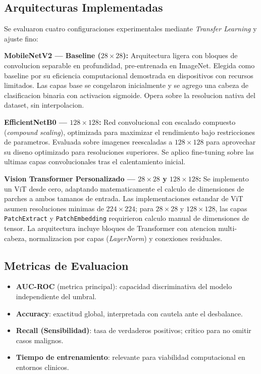 \documentclass[12pt, a4paper]{article}
\begin{document}
\subsection{Arquitecturas Implementadas}

Se evaluaron cuatro configuraciones experimentales mediante \textit{Transfer Learning} y ajuste fino:

\textbf{MobileNetV2 --- Baseline ($28\times28$):} Arquitectura ligera con bloques de convolucion separable en profundidad, pre-entrenada en ImageNet. Elegida como baseline por su eficiencia computacional demostrada en dispositivos con recursos limitados. Las capas base se congelaron inicialmente y se agrego una cabeza de clasificacion binaria con activacion sigmoide. Opera sobre la resolucion nativa del dataset, sin interpolacion.

\textbf{EfficientNetB0 --- $128\times128$:} Red convolucional con escalado compuesto (\textit{compound scaling}), optimizada para maximizar el rendimiento bajo restricciones de parametros. Evaluada sobre imagenes reescaladas a $128\times128$ para aprovechar su diseno optimizado para resoluciones superiores. Se aplico fine-tuning sobre las ultimas capas convolucionales tras el calentamiento inicial.

\textbf{Vision Transformer Personalizado --- $28\times28$ y $128\times128$:} Se implemento un ViT desde cero, adaptando matematicamente el calculo de dimensiones de parches a ambos tamanos de entrada. Las implementaciones estandar de ViT asumen resoluciones minimas de $224\times224$; para $28\times28$ y $128\times128$, las capas \texttt{PatchExtract} y \texttt{PatchEmbedding} requirieron calculo manual de dimensiones de tensor. La arquitectura incluye bloques de Transformer con atencion multi-cabeza, normalizacion por capas (\textit{LayerNorm}) y conexiones residuales.

\subsection{Metricas de Evaluacion}

\begin{itemize}
    \item \textbf{AUC-ROC} (metrica principal): capacidad discriminativa del modelo independiente del umbral.
    \item \textbf{Accuracy}: exactitud global, interpretada con cautela ante el desbalance.
    \item \textbf{Recall (Sensibilidad)}: tasa de verdaderos positivos; critico para no omitir casos malignos.
    \item \textbf{Tiempo de entrenamiento}: relevante para viabilidad computacional en entornos clinicos.
\end{itemize}
\end{document}
